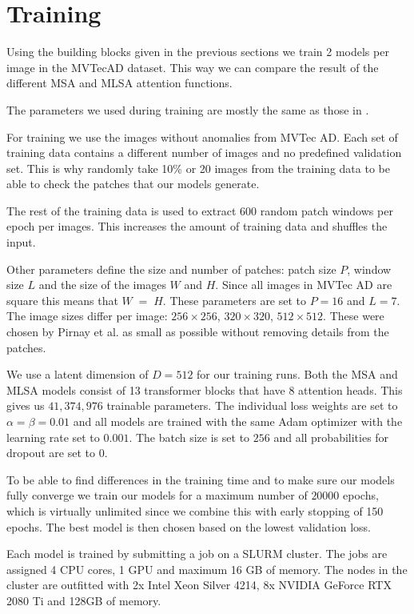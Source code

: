 \section{Training}

Using the building blocks given in the previous sections we train 2 models per image in the MVTecAD dataset. This way we can compare the result of the different MSA and MLSA attention functions.

The parameters we used during training are mostly the same as those in \cite{pirnay_inpainting_2021}.

For training we use the images without anomalies from MVTec AD. Each set of training data contains a different number of images and no predefined validation set. This is why randomly take 10\% or 20 images from the training data to be able to check the patches that our models generate.

The rest of the training data is used to extract 600 random patch windows per epoch per images. This increases the amount of training data and shuffles the input.

Other parameters define the size and number of patches: patch size $P$, window size $L$ and the size of the images $W$ and $H$. Since all images in MVTec AD are square this means that $W \;=\; H$. These parameters are set to $P = 16$ and $L = 7$. The image sizes differ per image: $256 \times 256$, $320 \times 320$, $512 \times 512$. These were chosen by Pirnay et al. as small as possible without removing details from the patches.

We use a latent dimension of $D = 512$ for our training runs. Both the MSA and MLSA models consist of 13 transformer blocks that have 8 attention heads. This gives us $41,374,976$ trainable parameters. The individual loss weights are set to $\alpha = \beta = 0.01$ and all models are trained with the same Adam optimizer with the learning rate set to $0.001$. The batch size is set to $256$ and all probabilities for dropout are set to $0$.


To be able to find differences in the training time and to make sure our models fully converge we train our models for a maximum number of $20000$ epochs, which is virtually unlimited since we combine this with early stopping of 150 epochs. The best model is then chosen based on the lowest validation loss.

Each model is trained by submitting a job on a SLURM cluster. The jobs are assigned 4 CPU cores, 1 GPU and maximum 16 GB of memory. The nodes in the cluster are outfitted with 2x Intel Xeon Silver 4214, 8x NVIDIA GeForce RTX 2080 Ti and 128GB of memory.


